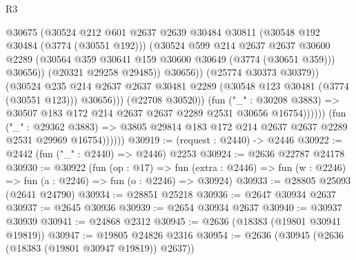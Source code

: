 \begin{lexlean}{R3}
\begin{coremodule}
                                      @30675
                                      (@30524
                                        @212
                                        @601
                                        @2637
                                        @2639
                                        @30484
                                        @30811
                                        (@30548 @192 @30484 (@3774 (@30551 @192)))
                                        (@30524
                                          @599
                                          @214
                                          @2637
                                          @2637
                                          @30600
                                          @2289
                                          (@30564
                                            @359
                                            @30641
                                            @159
                                            @30600
                                            @30649
                                            (@3774 (@30651 @359)))
                                          @30656))
                                      (@20321 @29258 @29485))
                                    @30656))
                                (@25774 @30373 @30379))
                              (@30524
                                @235
                                @214
                                @2637
                                @2637
                                @30481
                                @2289
                                (@30548 @123 @30481 (@3774 (@30551 @123)))
                                @30656)))
                          (@22708 @30520))
                        (fun ("_" : @30208 @3883) =>
                        @30507 @183 @172 @214 @2637 @2637 @2289 @2531 @30656 @16754))))))
              (fun ("_" : @29362 @3883) =>
              @3805 @29814 @183 @172 @214 @2637 @2637 @2289 @2531 @29969 @16754))))))
@30919 := (request : @2440) -> @2446
@30922 := @2442 (fun ("_" : @2440) => @2446) @2253
@30924 := @2636 @22787 @24178
@30930 := @30922
    (fun (op : @17) =>
    fun (extra : @2446) => fun (w : @2246) => fun (a : @2246) => fun (o : @2246) => @30924)
@30933 := @28805 @25093 (@2641 @24790)
@30934 := @28851 @25218
@30936 := @2647 @30934 @2637
@30937 := @2645 @30936
@30939 := @2654 @30934 @2637
@30940 := @30937 @30939
@30941 := @24868 @2312
@30945 := @2636 (@18383 (@19801 @30941 @19819))
@30947 := @19805 @24826 @2316
@30954 := @2636 (@30945 (@2636 (@18383 (@19801 @30947 @19819)) @2637))

\end{coremodule}
\end{lexlean}

